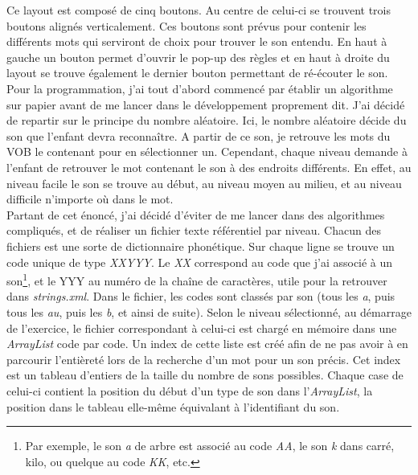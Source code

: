 Ce layout est composé de cinq boutons. Au centre de celui-ci se trouvent trois boutons alignés verticalement. Ces boutons sont prévus pour contenir les différents mots qui serviront de choix pour trouver le son entendu. En haut à gauche un bouton permet d'ouvrir le pop-up des règles et en haut à droite du layout se trouve également le dernier bouton permettant de ré-écouter le son.\\

Pour la programmation, j'ai tout d'abord commencé par établir un algorithme sur papier avant de me lancer dans le développement proprement dit. J'ai décidé de repartir sur le principe du nombre aléatoire. Ici, le nombre aléatoire décide du son que l'enfant devra reconnaître. A partir de ce son, je retrouve les mots du VOB le contenant pour en sélectionner un. Cependant, chaque niveau demande à l'enfant de retrouver le mot contenant le son à des endroits différents. En effet, au niveau facile le son se trouve au début, au niveau moyen au milieu, et au niveau difficile n'importe où dans le mot.\\

Partant de cet énoncé, j'ai décidé d'éviter de me lancer dans des algorithmes compliqués, et de réaliser un fichier texte référentiel par niveau. Chacun des fichiers est une sorte de dictionnaire phonétique. Sur chaque ligne se trouve un code unique de type \textit{XXYYY}. Le \textit{XX} correspond au code que j'ai associé à un son\footnote{Par exemple, le son \textit{a} de arbre est associé au code \textit{AA}, le son \textit{k} dans carré, kilo, ou quelque au code \textit{KK}, etc.}, et le YYY au numéro de la chaîne de caractères, utile pour la retrouver dans \textit{strings.xml}. Dans le fichier, les codes sont classés par son (tous les \textit{a}, puis tous les \textit{au}, puis les \textit{b}, et ainsi de suite). Selon le niveau sélectionné, au démarrage de l'exercice, le fichier correspondant à celui-ci est chargé en mémoire dans une \textit{ArrayList} code par code. Un index de cette liste est créé afin de ne pas avoir à en parcourir l'entièreté lors de la recherche d'un mot pour un son précis. Cet index est un tableau d'entiers de la taille du nombre de sons possibles. Chaque case de celui-ci contient la position du début d'un type de son dans l'\textit{ArrayList}, la position dans le tableau elle-même équivalant à l'identifiant du son.\\

